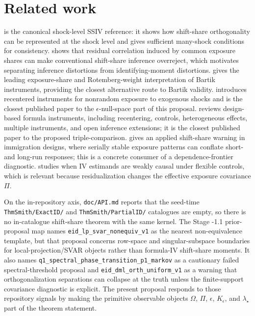 \documentclass[11pt]{article}
\theoremstyle{definition}
\theoremstyle{plain}
\theoremstyle{remark}
\begin{document}
\section{Related work}
\citet{BorusyakHullJaravel2022REStud} is the canonical shock-level SSIV reference: it shows how shift-share orthogonality can be represented at the shock level and gives sufficient many-shock conditions for consistency.  \citet{AdaoKolesarMorales2019QJE} shows that residual correlation induced by common exposure shares can make conventional shift-share inference overreject, which motivates separating inference distortions from identifying-moment distortions.  \citet{GoldsmithPinkhamSorkinSwift2020AER} gives the leading exposure-share and Rotemberg-weight interpretation of Bartik instruments, providing the closest alternative route to Bartik validity.  \citet{BorusyakHull2023Econometrica} introduces recentered instruments for nonrandom exposure to exogenous shocks and is the closest published paper to the $\epsilon$-null-space part of this proposal.  \citet{BorusyakHullJaravel2025ECTJ} reviews design-based formula instruments, including recentering, controls, heterogeneous effects, multiple instruments, and open inference extensions; it is the closest published paper to the proposed triple-comparison.  \citet{JaegerRuistStuhler2018NBER} gives an applied shift-share warning in immigration designs, where serially stable exposure patterns can conflate short- and long-run responses; this is a concrete consumer of a dependence-frontier diagnostic.  \citet{BlandholBonneyMogstadTorgovitsky2022NBER} studies when IV estimands are weakly causal under flexible controls, which is relevant because residualization changes the effective exposure covariance $\Pi$.

On the in-repository axis, \texttt{doc/API.md} reports that the seed-time \texttt{ThmSmith/ExactID/} and \texttt{ThmSmith/PartialID/} catalogues are empty, so there is no in-catalogue shift-share theorem with the same kernel.  The Stage -1.1 prior-proposal map names \texttt{eid\_lp\_svar\_nonequiv\_v1} as the nearest non-equivalence template, but that proposal concerns row-space and singular-subspace boundaries for local-projection/SVAR objects rather than formula-IV shift-share moments.  It also names \texttt{q1\_spectral\_phase\_transition\_p1\_markov} as a cautionary failed spectral-threshold proposal and \texttt{eid\_dml\_orth\_uniform\_v1} as a warning that orthogonalization separations can collapse at the truth unless the finite-support covariance diagnostic is explicit.  The present proposal responds to those repository signals by making the primitive observable objects $\Omega$, $\Pi$, $\epsilon$, $K_\epsilon$, and $\lambda_\star$ part of the theorem statement.
\end{document}
